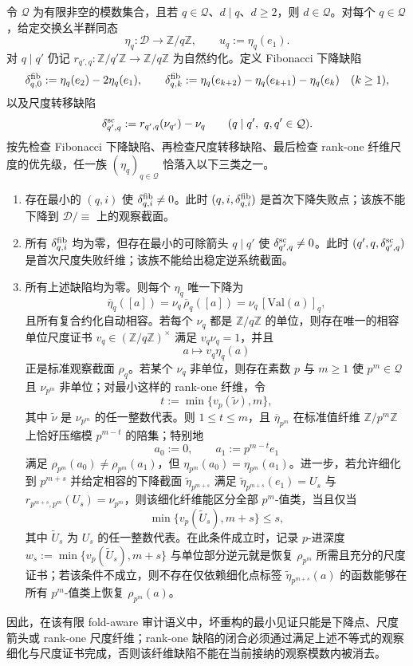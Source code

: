 \begin{theorem}\label{distill:connes_consani_arithmetic_site-point_spectrum_obstruction_classification-finite-fold-aware-rank-one-spectrum-audit}
令 \(\mathcal Q\) 为有限非空的模数集合，且若 \(q\in\mathcal Q\)、\(d\mid q\)、\(d\ge2\)，则 \(d\in\mathcal Q\)。对每个 \(q\in\mathcal Q\)，给定交换幺半群同态
\[
\eta_q:\mathcal D\longrightarrow \mathbb Z/q\mathbb Z,
\qquad
u_q:=\eta_q(e_1).
\]
对 \(q\mid q'\) 仍记 \(r_{q',q}:\mathbb Z/q'\mathbb Z\to\mathbb Z/q\mathbb Z\) 为自然约化。定义 Fibonacci 下降缺陷
\[
\delta^{\rm fib}_{q,0}:=\eta_q(e_2)-2\eta_q(e_1),
\qquad
\delta^{\rm fib}_{q,k}:=\eta_q(e_{k+2})-\eta_q(e_{k+1})-\eta_q(e_k)\quad(k\ge1),
\]
以及尺度转移缺陷
\[
\delta^{\rm sc}_{q',q}:=r_{q',q}(\nu_{q'})-\nu_q\qquad(q\mid q',\ q,q'\in\mathcal Q).
\]
按先检查 Fibonacci 下降缺陷、再检查尺度转移缺陷、最后检查 rank-one 纤维尺度的优先级，任一族 \((\eta_q)_{q\in\mathcal Q}\) 恰落入以下三类之一。
\begin{enumerate}
  \item 存在最小的 \((q,i)\) 使 \(\delta^{\rm fib}_{q,i}\ne0\)。此时 \((q,i,\delta^{\rm fib}_{q,i})\) 是首次下降失败点；该族不能下降到 \(\mathcal D/\!\equiv\) 上的观察截面。
  \item 所有 \(\delta^{\rm fib}_{q,i}\) 均为零，但存在最小的可除箭头 \(q\mid q'\) 使 \(\delta^{\rm sc}_{q',q}\ne0\)。此时 \((q',q,\delta^{\rm sc}_{q',q})\) 是首次尺度失败纤维；该族不能给出稳定逆系统截面。
  \item 所有上述缺陷均为零。则每个 \(\eta_q\) 唯一下降为
  \[
  \overline\eta_q([a])=\nu_q\,\overline\rho_q([a])=\nu_q\,[\mathrm{Val}(a)]_q,
  \]
  且所有复合约化自动相容。若每个 \(\nu_q\) 都是 \(\mathbb Z/q\mathbb Z\) 的单位，则存在唯一的相容单位尺度证书 \(v_q\in(\mathbb Z/q\mathbb Z)^\times\) 满足 \(v_q\nu_q=1\)，并且
  \[
  a\longmapsto v_q\eta_q(a)
  \]
  正是标准观察截面 \(\rho_q\)。若某个 \(\nu_q\) 非单位，则存在素数 \(p\) 与 \(m\ge1\) 使 \(p^m\in\mathcal Q\) 且 \(\nu_{p^m}\) 非单位；对最小这样的 rank-one 纤维，令
  \[
  t:=\min\{v_p(\widetilde\nu),m\},
  \]
  其中 \(\widetilde\nu\) 是 \(\nu_{p^m}\) 的任一整数代表。则 \(1\le t\le m\)，且 \(\overline\eta_{p^m}\) 在标准值纤维 \(\mathbb Z/p^m\mathbb Z\) 上恰好压缩模 \(p^{m-t}\) 的陪集；特别地
  \[
  a_0:=0,
  \qquad
  a_1:=p^{m-t}e_1
  \]
  满足 \(\rho_{p^m}(a_0)\ne\rho_{p^m}(a_1)\)，但 \(\eta_{p^m}(a_0)=\eta_{p^m}(a_1)\)。进一步，若允许细化到 \(p^{m+s}\) 并给定相容的下降截面 \(\widetilde\eta_{p^{m+s}}\) 满足 \(\widetilde\eta_{p^{m+s}}(e_1)=U_s\) 与 \(r_{p^{m+s},p^m}(U_s)=\nu_{p^m}\)，则该细化纤维能区分全部 \(p^m\)-值类，当且仅当
  \[
  \min\{v_p(\widetilde U_s),m+s\}\le s,
  \]
  其中 \(\widetilde U_s\) 为 \(U_s\) 的任一整数代表。在此条件成立时，记录 \(p\)-进深度 \(w_s:=\min\{v_p(\widetilde U_s),m+s\}\) 与单位部分逆元就是恢复 \(\rho_{p^m}\) 所需且充分的尺度证书；若该条件不成立，则不存在仅依赖细化点标签 \(\widetilde\eta_{p^{m+s}}(a)\) 的函数能够在所有 \(p^m\)-值类上恢复 \(\rho_{p^m}(a)\)。
\end{enumerate}
因此，在该有限 fold-aware 审计语义中，坏重构的最小见证只能是下降点、尺度箭头或 rank-one 尺度纤维；rank-one 缺陷的闭合必须通过满足上述不等式的观察细化与尺度证书完成，否则该纤维缺陷不能在当前接纳的观察模数内被消去。
\end{theorem}
